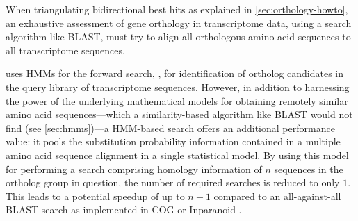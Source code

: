 \label{sec:hmm-forward-search}
When triangulating bidirectional best hits as explained in
\autoref{sec:orthology-howto}, an exhaustive assessment of gene orthology in
transcriptome data, using a search algorithm like BLAST, must try to align all
orthologous amino acid sequences to all transcriptome sequences.  

\pname uses HMMs for the forward search, \ie, for identification of ortholog
candidates in the query library of transcriptome sequences. However, in addition
to harnessing the power of the underlying mathematical models for obtaining
remotely similar amino acid sequences---which a similarity-based algorithm like
BLAST would not find (see \autoref{sec:hmms})---a HMM-based search offers an
additional performance value: it pools the substitution probability information
contained in a multiple amino acid sequence alignment in a single statistical
model. By using this model for performing a search comprising homology
information of $n$ sequences in the ortholog group in question, the number of
required searches is reduced to only $1$. This leads to a potential speedup of
up to $n-1$ compared to an all-against-all BLAST search as implemented in COG
\citep{li2003} or Inparanoid \citep{ostlund2010}.

